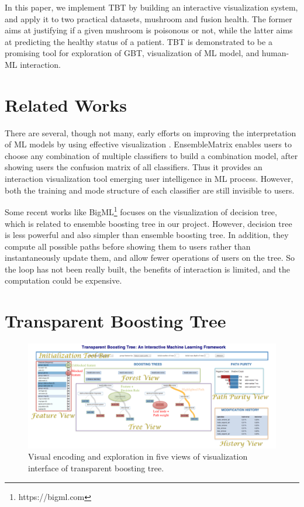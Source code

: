 \documentclass{chi2009}
\begin{document}
In this paper, we implement TBT by building an interactive visualization system, and apply it to two practical datasets, mushroom and fusion health. The former aims at justifying if a given mushroom is poisonous or not, while the latter aims at predicting the healthy status of a patient. TBT is demonstrated to be a promising tool for exploration of GBT, visualization of ML model, and human-ML interaction.

\section{Related Works}

There are several, though not many, early efforts on improving the interpretation of ML models by using effective visualization \cite{aai}. EnsembleMatrix \cite{Ematrix} enables users to choose any combination of multiple classifiers to build a combination model, after showing users the confusion matrix of all classifiers. Thus it provides an interaction visualization tool emerging user intelligence in ML process. However, both the training and mode structure of each classifier are still invisible to users.

Some recent works like BigML\footnote{https://bigml.com} focuses on the visualization of decision tree, which is related to ensemble boosting tree in our project. However, decision tree is less powerful and also simpler than ensemble boosting tree. In addition, they compute all possible paths before showing them to users rather than instantaneously update them, and allow fewer operations of users on the tree. So the loop has not been really built, the benefits of interaction is limited, and the computation could be expensive.

\section{Transparent Boosting Tree}

\begin{figure}[tH!]
\begin{center}
 \includegraphics[width=1.05\linewidth]{intface.pdf}
\end{center}
   \caption{Visual encoding and exploration in five views of visualization interface of transparent boosting tree.}
\label{fig:interface}
\end{figure} 
\end{document}
